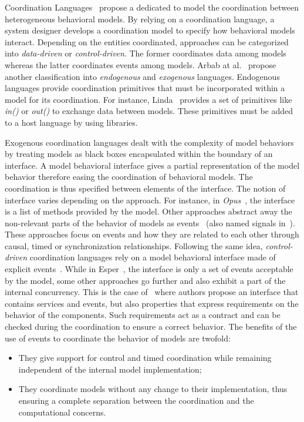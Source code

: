 Coordination Languages~\cite{coordsignibib} propose a dedicated to model the coordination between heterogeneous behavioral models. By relying on a coordination language, a system designer develops a coordination model to specify how behavioral models interact. Depending on the entities coordinated, approaches can be categorized into \emph{data-driven} or \emph{control-driven}. The former coordinates data among models whereas the latter coordinates events among models. Arbab at al.~\cite{whatdocoord} propose another classification into \emph{endogenous} and \emph{exogenous} languages. Endogenous languages provide coordination primitives that must be incorporated within a model for its coordination. For instance, Linda~\cite{lindabib} provides a set of primitives like \emph{in()} or \emph{out()} to exchange data between models. These primitives must be added to a host language by using libraries. 

Exogenous coordination languages dealt with the complexity of model behaviors by treating models as black boxes encapsulated within the boundary of an interface. A model behavioral interface gives a partial representation of the model behavior therefore easing the coordination of behavioral models. The coordination is thus specified between elements of the interface. The notion of interface varies depending on the approach. For instance, in \emph{Opus}~\cite{Opus}, the interface is a list of methods provided by the model. Other approaches abstract away the non-relevant parts of the behavior of models as events~\cite{eventStructures} (also named signals in~\cite{lee1998framework}). These approaches focus on events and how they are related to each other through causal, timed or synchronization relationships. Following the same idea, \emph{control-driven} coordination languages rely on a model behavioral interface made of explicit events~\cite{esperbib,manifoldbib,coordinainterfacebib}. While in Esper~\cite{esperbib}, the interface is only a set of events acceptable by the model, some other approaches go further and also exhibit a part of the internal concurrency. This is the case of~\cite{coordinainterfacebib} where authors propose an interface that contains services and events, but also properties that express requirements on the behavior of the components. Such requirements act as a contract and can be checked during the coordination to ensure a correct behavior. The benefits of the use of events to coordinate the behavior of models are twofold:
\begin{itemize}	
	\item They give support for control and timed coordination while remaining independent of the internal model implementation;
	\item They coordinate models without any change to their implementation, thus ensuring a complete separation between the coordination and the computational concerns.
\end{itemize}

